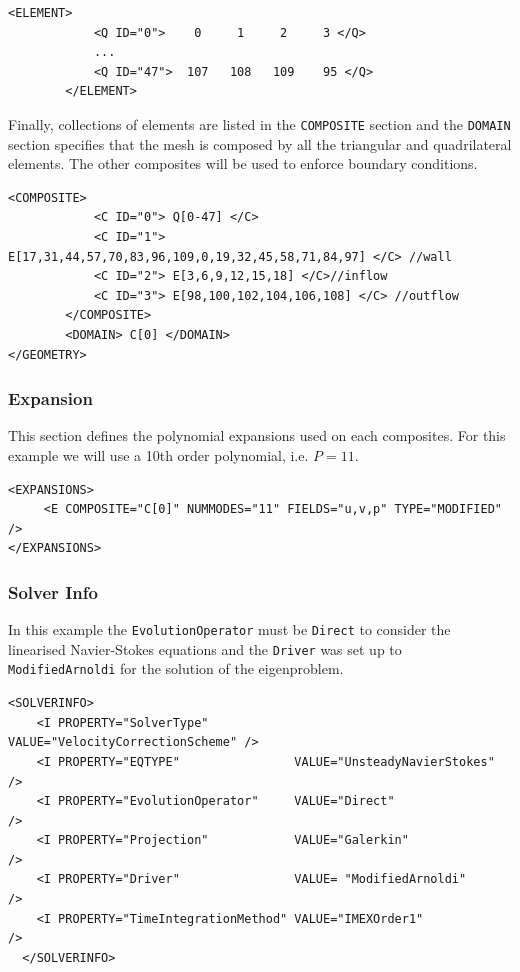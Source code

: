   \begin{lstlisting}[style=XMLStyle]
        <ELEMENT>
            <Q ID="0">    0     1     2     3 </Q>
            ...
            <Q ID="47">  107   108   109    95 </Q>
        </ELEMENT>
        \end{lstlisting}

Finally, collections of elements are listed in the \texttt{COMPOSITE} section and the \texttt{DOMAIN} section specifies that the mesh is composed by all the triangular and quadrilateral elements. The other composites will be used to enforce boundary conditions.

  \begin{lstlisting}[style=XMLStyle]
              <COMPOSITE>
            <C ID="0"> Q[0-47] </C>
            <C ID="1"> E[17,31,44,57,70,83,96,109,0,19,32,45,58,71,84,97] </C> //wall
            <C ID="2"> E[3,6,9,12,15,18] </C>//inflow
            <C ID="3"> E[98,100,102,104,106,108] </C> //outflow
        </COMPOSITE>
        <DOMAIN> C[0] </DOMAIN>
</GEOMETRY>
  \end{lstlisting}

  \subsubsection{Expansion}

  This section defines the polynomial expansions used on each composites. For this example we will use a 10th order polynomial, i.e. $P=11$.

  \begin{lstlisting}[style=XMLStyle]
<EXPANSIONS>
     <E COMPOSITE="C[0]" NUMMODES="11" FIELDS="u,v,p" TYPE="MODIFIED" />
</EXPANSIONS>
  \end{lstlisting}

  \subsubsection{Solver Info}

  In this example the \texttt{EvolutionOperator} must be \texttt{Direct} to consider the linearised Navier-Stokes equations and the \texttt{Driver} was set up to \texttt{ModifiedArnoldi} for the solution of the eigenproblem.

    \begin{lstlisting}[style=XMLStyle]
  <SOLVERINFO>
    <I PROPERTY="SolverType"            VALUE="VelocityCorrectionScheme" />
    <I PROPERTY="EQTYPE"                VALUE="UnsteadyNavierStokes"     />
    <I PROPERTY="EvolutionOperator"     VALUE="Direct"                   />
    <I PROPERTY="Projection"            VALUE="Galerkin"                 />
    <I PROPERTY="Driver"                VALUE= "ModifiedArnoldi"         />
    <I PROPERTY="TimeIntegrationMethod" VALUE="IMEXOrder1"               />
  </SOLVERINFO>
      \end{lstlisting}


